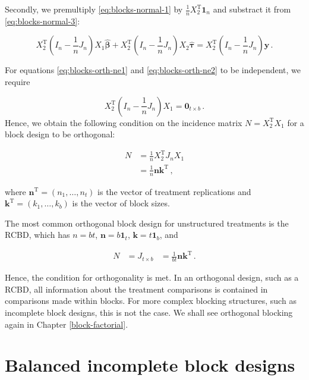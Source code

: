 \documentclass[
]{book}
\theoremstyle{definition}
\theoremstyle{definition}
\theoremstyle{definition}
\theoremstyle{definition}
\theoremstyle{remark}
\begin{document}
Secondly, we premultiply \eqref{eq:blocks-normal-1} by \(\frac{1}{n}X_2^{\mathrm{T}}\boldsymbol{1}_n\) and substract it from \eqref{eq:blocks-normal-3}:

\begin{equation}
X_2^{\mathrm{T}}\left(I_n - \frac{1}{n}J_n\right)X_1\hat{\boldsymbol{\beta}} + X_2^{\mathrm{T}}\left(I_n - \frac{1}{n}J_n\right)X_2\hat{\boldsymbol{\tau}} = X_2^{\mathrm{T}}\left(I_n - \frac{1}{n}J_n\right)\boldsymbol{y}\,.
\label{eq:blocks-orth-ne2}
\end{equation}

For equations \eqref{eq:blocks-orth-ne1} and \eqref{eq:blocks-orth-ne2} to be independent, we require

\[
X_2^{\mathrm{T}}\left(I_n - \frac{1}{n}J_n\right)X_1 = \boldsymbol{0}_{t\times b}\,.
\]
Hence, we obtain the following condition on the incidence matrix \(N = X_2^{\mathrm{T}}X_1\) for a block design to be orthogonal:

\begin{align}
N & = \frac{1}{n}X_2^{\mathrm{T}}J_nX_1 \\
& = \frac{1}{n}\boldsymbol{n}\boldsymbol{k}^{\mathrm{T}}\,,
\end{align}

where \(\boldsymbol{n}^{\mathrm{T}} = (n_1,\ldots, n_t)\) is the vector of treatment replications and \(\boldsymbol{k}^{\mathrm{T}} = (k_1,\ldots, k_b)\) is the vector of block sizes.

The most common orthogonal block design for unstructured treatments is the RCBD, which has \(n = bt\), \(\boldsymbol{n} = b\boldsymbol{1}_t\), \(\boldsymbol{k} = t\boldsymbol{1}_b\), and

\begin{align}
N & = J_{t \times b}
& = \frac{1}{bt}\boldsymbol{n}\boldsymbol{k}^{\mathrm{T}}\,.
\end{align}

Hence, the condition for orthogonality is met. In an orthogonal design, such as a RCBD, all information about the treatment comparisons is contained in comparisons made within blocks. For more complex blocking structures, such as incomplete block designs, this is not the case. We shall see orthogonal blocking again in Chapter \ref{block-factorial}.

\hypertarget{sec-bibd}{%
\section{Balanced incomplete block designs}\label{sec-bibd}}
\end{document}
